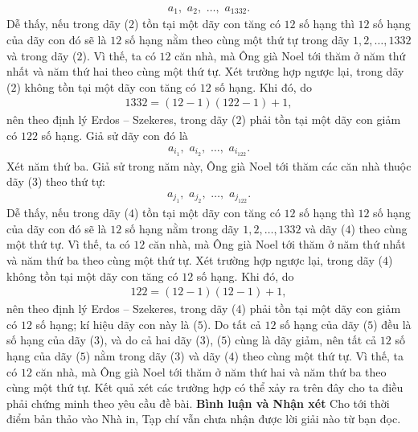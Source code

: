 \begin{multicols}{2}
{\begin{align*}
		{a_1},\,\,{a_2},\,\, \ldots ,\,\,{a_{1332}}. \tag{$2$}
	\end{align*}
	Dễ thấy, nếu trong dãy ($2$) tồn tại một dãy con tăng có $12$ số hạng thì $12$ số hạng của dãy con đó sẽ là $12$ số hạng nằm theo cùng một thứ tự trong dãy $1, 2, \ldots, 1332$ và trong dãy ($2$). Vì thế, ta có $12$ căn nhà, mà Ông già Noel tới thăm ở năm thứ nhất và năm thứ hai theo cùng một thứ tự.
	\vskip 0.05cm
	Xét trường hợp ngược lại, trong dãy ($2$) không tồn tại một dãy con tăng có $12$ số hạng.
	\vskip 0.05cm
	Khi đó, do
	\begin{align*}
		1332 = (12 - 1)(122 - 1) + 1,
	\end{align*}
	nên theo định lý Erdos -- Szekeres, trong dãy ($2$) phải tồn tại một dãy con giảm có $122$ số hạng. Giả sử dãy con đó là
	\begin{align*}
		{a_{{i_1}}},\,\,{a_{{i_2}}},\,\, \ldots ,\,\,{a_{{i_{122}}}}. \tag{$3$}
	\end{align*}
	Xét năm thứ ba. Giả sử trong năm này, Ông già Noel tới thăm các căn nhà thuộc dãy ($3$) theo thứ tự:
	\begin{align*}
		{a_{{j_1}}},\,\,{a_{{j_2}}},\,\, \ldots ,\,\,{a_{{j_{122}}}}. \tag{$4$}
	\end{align*}
	Dễ thấy, nếu trong dãy ($4$) tồn tại một dãy con tăng có $12$ số hạng thì $12$ số hạng của dãy con đó sẽ là $12$ số hạng nằm trong dãy $1, 2, \ldots, 1332$ và dãy ($4$) theo cùng một thứ tự. Vì thế, ta có $12$ căn nhà, mà Ông già Noel tới thăm ở năm thứ nhất và năm thứ ba theo cùng một thứ tự.
	\vskip 0.05cm
	Xét trường hợp ngược lại, trong dãy ($4$) không tồn tại một dãy con tăng có $12$ số hạng.
	\vskip 0.05cm
	Khi đó, do
	\begin{align*}
		122 = (12 - 1)(12 - 1) + 1,
	\end{align*}
	nên theo định lý Erdos -- Szekeres, trong dãy ($4$) phải tồn tại một dãy con giảm có $12$ số hạng; kí hiệu dãy con này là ($5$).
	\vskip 0.05cm
	Do tất cả $12$ số hạng của dãy ($5$) đều là số hạng của dãy ($3$), và do cả hai dãy ($3$), ($5$) cùng là dãy giảm, nên tất cả $12$ số hạng của dãy ($5$) nằm trong dãy ($3$) và dãy ($4$) theo cùng một thứ tự. Vì thế, ta có $12$ căn nhà, mà Ông già Noel tới thăm ở năm thứ hai và năm thứ ba theo cùng một thứ tự.
	\vskip 0.05cm
	Kết quả xét các trường hợp có thể xảy ra trên đây cho ta điều phải chứng minh theo yêu cầu đề bài.
	\vskip 0.05cm
	\textbf{Bình luận và Nhận xét}
	\vskip 0.05cm
	Cho tới thời điểm bản thảo vào Nhà in, Tạp chí vẫn chưa nhận được lời giải nào từ bạn đọc.
	\begin{flushright}

\end{flushright}}
\end{multicols}
